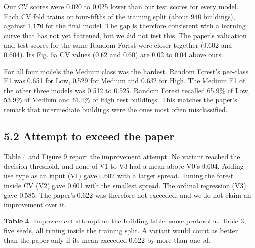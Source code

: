 \documentclass[
  10pt,
]{article}
\begin{document}
Our CV scores were 0.020 to 0.025 lower than our test scores for every
model. Each CV fold trains on four-fifths of the training split (about
940 buildings), against 1,176 for the final model. The gap is therefore
consistent with a learning curve that has not yet flattened, but we did
not test this. The paper's validation and test scores for the same
Random Forest were closer together (0.602 and 0.604). Its Fig. 6a CV
values (0.62 and 0.60) are 0.02 to 0.04 above ours.

For all four models the Medium class was the hardest. Random Forest's
per-class F1 was 0.651 for Low, 0.529 for Medium and 0.632 for High. The
Medium F1 of the other three models was 0.512 to 0.525. Random Forest
recalled 65.9\% of Low, 53.9\% of Medium and 61.4\% of High test
buildings. This matches the paper's remark that intermediate buildings
were the ones most often misclassified.

\hypertarget{attempt-to-exceed-the-paper}{%
\subsection{5.2 Attempt to exceed the
paper}\label{attempt-to-exceed-the-paper}}

Table 4 and Figure 9 report the improvement attempt. No variant reached
the decision threshold, and none of V1 to V3 had a mean above V0's
0.604. Adding use type as an input (V1) gave 0.602 with a larger spread.
Tuning the forest inside CV (V2) gave 0.601 with the smallest spread.
The ordinal regression (V3) gave 0.585. The paper's 0.622 was therefore
not exceeded, and we do not claim an improvement over it.

\textbf{Table 4.} Improvement attempt on the building table: same
protocol as Table 3, five seeds, all tuning inside the training split. A
variant would count as better than the paper only if its mean exceeded
0.622 by more than one sd.
\end{document}
